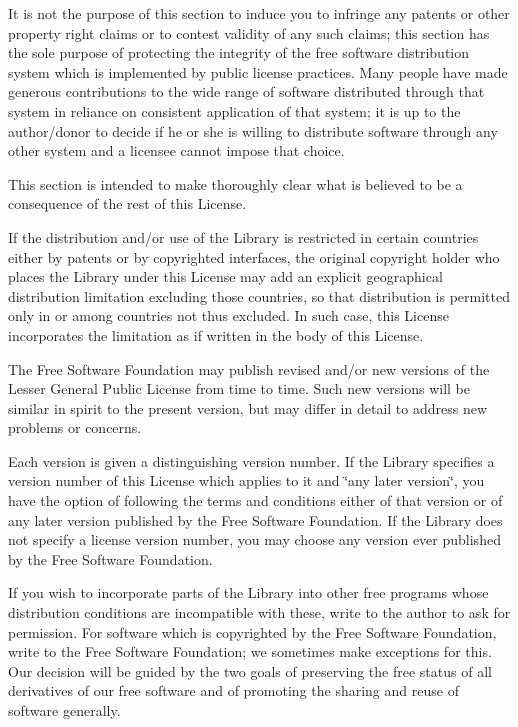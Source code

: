 It is not the purpose of this section to induce you to infringe any patents or other property right claims or to contest validity of any such claims; this section has the sole purpose of protecting the integrity of the free software distribution system which is implemented by public license practices. Many people have made generous contributions to the wide range of software distributed through that system in reliance on consistent application of that system; it is up to the author/donor to decide if he or she is willing to distribute software through any other system and a licensee cannot impose that choice.

This section is intended to make thoroughly clear what is believed to be a consequence of the rest of this License.
\begin{DoxyEnumerate}
\item If the distribution and/or use of the Library is restricted in certain countries either by patents or by copyrighted interfaces, the original copyright holder who places the Library under this License may add an explicit geographical distribution limitation excluding those countries, so that distribution is permitted only in or among countries not thus excluded. In such case, this License incorporates the limitation as if written in the body of this License.
\item The Free Software Foundation may publish revised and/or new versions of the Lesser General Public License from time to time. Such new versions will be similar in spirit to the present version, but may differ in detail to address new problems or concerns.
\end{DoxyEnumerate}

Each version is given a distinguishing version number. If the Library specifies a version number of this License which applies to it and \char`\"{}any later version\char`\"{}, you have the option of following the terms and conditions either of that version or of any later version published by the Free Software Foundation. If the Library does not specify a license version number, you may choose any version ever published by the Free Software Foundation.
\begin{DoxyEnumerate}
\item If you wish to incorporate parts of the Library into other free programs whose distribution conditions are incompatible with these, write to the author to ask for permission. For software which is copyrighted by the Free Software Foundation, write to the Free Software Foundation; we sometimes make exceptions for this. Our decision will be guided by the two goals of preserving the free status of all derivatives of our free software and of promoting the sharing and reuse of software generally.
\end{DoxyEnumerate}

